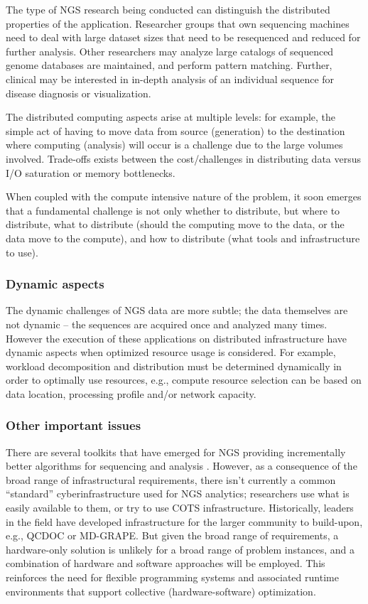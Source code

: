 The type of NGS research being conducted can distinguish the
distributed properties of the application. Researcher groups that
own sequencing machines need to deal with large dataset sizes that
need to be resequenced and reduced for further analysis. Other
researchers may analyze large catalogs of sequenced genome databases
are maintained, and perform pattern matching. Further, clinical may be
interested in in-depth analysis of an individual sequence for disease
diagnosis or visualization.

The distributed computing aspects arise at multiple levels: for
example, the simple act of having to move data from source
(generation) to the destination where computing (analysis) will occur
is a challenge due to the large volumes involved. Trade-offs exists
between the cost/challenges in distributing data versus I/O
saturation or memory bottlenecks.

When coupled with the compute intensive nature of the problem, it soon
emerges that a fundamental challenge is not only whether to
distribute, but where to distribute, what to distribute (should the
computing move to the data, or the data move to the compute), and how
to distribute (what tools and infrastructure to use).

\subsubsection*{Dynamic aspects}

The dynamic challenges of NGS data are more subtle; the data
themselves are not dynamic -- the sequences are acquired once and
analyzed many times. However the execution of these applications on
distributed infrastructure have dynamic aspects when optimized
resource usage is considered. For example, workload decomposition and
distribution must be determined dynamically in order to optimally use
resources, e.g., compute resource selection can be based on data
location, processing profile and/or network capacity.

\subsubsection*{Other important issues}

There are several toolkits that have emerged for NGS providing
incrementally better algorithms for sequencing and analysis
\cite{SAMtools, BioJava, BioPerl, .NETBio}.  However, as a consequence
of the broad range of infrastructural requirements, there isn't
currently a common ``standard'' cyberinfrastructure used for NGS
analytics; researchers use what is easily available to them, or try to
use COTS infrastructure. Historically, leaders in the field have
developed infrastructure for the larger community to build-upon, e.g.,
QCDOC or MD-GRAPE. But given the broad range of requirements, a
hardware-only solution is unlikely for a broad range of problem
instances, and a combination of hardware and software approaches will
be employed. This reinforces the need for flexible programming systems
and associated runtime environments that support collective
(hardware-software) optimization.

